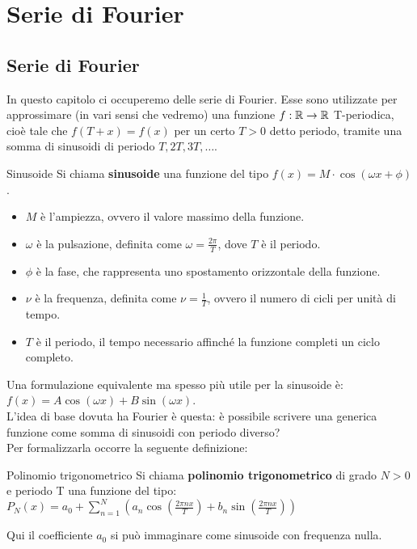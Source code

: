 \chapter{Serie di Fourier}

\section{Serie di Fourier}
In questo capitolo ci occuperemo delle serie di Fourier. Esse sono utilizzate per approssimare (in vari sensi che vedremo) una funzione $f:\mathbb{R} \to \mathbb{R}$ T-periodica, cioè tale che $f(T+x)=f(x)$ per un certo $T>0$ detto periodo, tramite una somma di sinusoidi di periodo $T, 2T, 3T, \dots$.

\begin{definizione}{Sinusoide}
  Si chiama \textbf{sinusoide} una funzione del tipo $f(x) = M\cdot \cos(\omega x +\phi)$.
  \begin{itemize}
    \item $M$ è l'ampiezza, ovvero il valore massimo della funzione.
    \item $\omega$ è la pulsazione, definita come $\omega = \frac{2\pi}{T}$, dove $T$ è il periodo.
    \item $\phi$ è la fase, che rappresenta uno spostamento orizzontale della funzione.
    \item $\nu$ è la frequenza, definita come $\nu = \frac{1}{T}$, ovvero il numero di cicli per unità di tempo.
    \item $T$ è il periodo, il tempo necessario affinché la funzione completi un ciclo completo.
  \end{itemize}
\end{definizione}
Una formulazione equivalente ma spesso più utile per la sinusoide è:\\
$f(x) = A\cos(\omega x) + B\sin(\omega x)$.\\

L'idea di base dovuta ha Fourier è questa: è possibile scrivere una generica funzione come somma di sinusoidi con periodo diverso?
\\
Per formalizzarla occorre la seguente definizione:
\begin{definizione}{Polinomio trigonometrico}
  Si chiama \textbf{polinomio trigonometrico} di grado $N>0$ e periodo T una funzione del tipo:
  $P_N(x) = a_0 + \sum_{n=1}^{N} \left( a_n \cos\left(\frac{2\pi nx}{T}\right) + b_n \sin\left(\frac{2\pi nx}{T}\right) \right)$
\end{definizione}
Qui il coefficiente $a_0$ si può immaginare come sinusoide con frequenza nulla.

